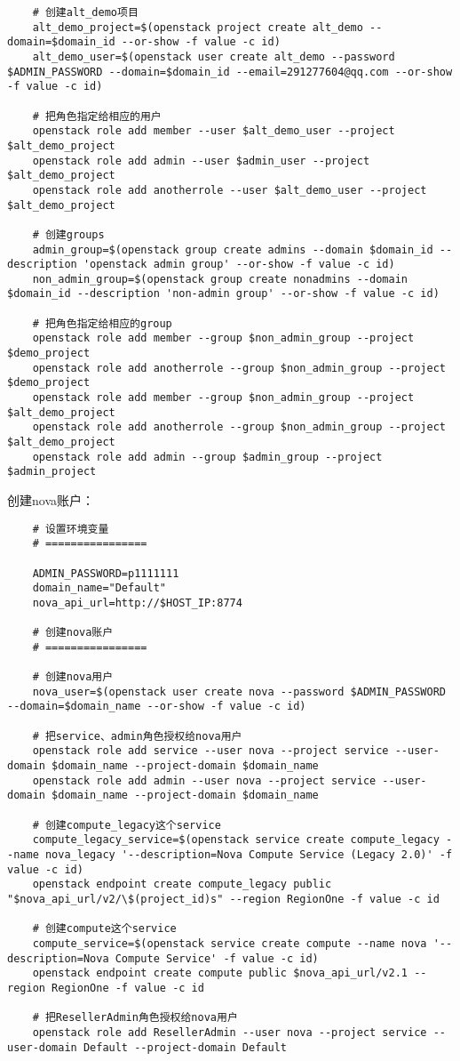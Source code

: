 \documentclass[a4paper,left=1.5cm,right=1.5cm,11pt]{article}
\begin{document}
\begin{lstlisting}
	# 创建alt_demo项目
	alt_demo_project=$(openstack project create alt_demo --domain=$domain_id --or-show -f value -c id)
	alt_demo_user=$(openstack user create alt_demo --password $ADMIN_PASSWORD --domain=$domain_id --email=291277604@qq.com --or-show -f value -c id)
	
	# 把角色指定给相应的用户
	openstack role add member --user $alt_demo_user --project $alt_demo_project
	openstack role add admin --user $admin_user --project $alt_demo_project
	openstack role add anotherrole --user $alt_demo_user --project $alt_demo_project
	
	# 创建groups
	admin_group=$(openstack group create admins --domain $domain_id --description 'openstack admin group' --or-show -f value -c id)
	non_admin_group=$(openstack group create nonadmins --domain $domain_id --description 'non-admin group' --or-show -f value -c id)
	
	# 把角色指定给相应的group
	openstack role add member --group $non_admin_group --project $demo_project
	openstack role add anotherrole --group $non_admin_group --project $demo_project
	openstack role add member --group $non_admin_group --project $alt_demo_project
	openstack role add anotherrole --group $non_admin_group --project $alt_demo_project	
	openstack role add admin --group $admin_group --project $admin_project
	\end{lstlisting}

	创建nova账户：
	\begin{lstlisting}
	# 设置环境变量
	# ================

	ADMIN_PASSWORD=p1111111
	domain_name="Default"
	nova_api_url=http://$HOST_IP:8774

	# 创建nova账户
	# ================

	# 创建nova用户
	nova_user=$(openstack user create nova --password $ADMIN_PASSWORD --domain=$domain_name --or-show -f value -c id)
	
	# 把service、admin角色授权给nova用户
	openstack role add service --user nova --project service --user-domain $domain_name --project-domain $domain_name
	openstack role add admin --user nova --project service --user-domain $domain_name --project-domain $domain_name
	
	# 创建compute_legacy这个service
	compute_legacy_service=$(openstack service create compute_legacy --name nova_legacy '--description=Nova Compute Service (Legacy 2.0)' -f value -c id)
	openstack endpoint create compute_legacy public "$nova_api_url/v2/\$(project_id)s" --region RegionOne -f value -c id
	
	# 创建compute这个service
	compute_service=$(openstack service create compute --name nova '--description=Nova Compute Service' -f value -c id)
	openstack endpoint create compute public $nova_api_url/v2.1 --region RegionOne -f value -c id
	
	# 把ResellerAdmin角色授权给nova用户
	openstack role add ResellerAdmin --user nova --project service --user-domain Default --project-domain Default
	\end{lstlisting}
\end{document}
